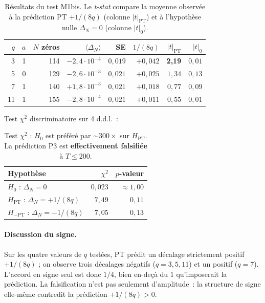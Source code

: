 \begin{table}[ht]
\centering
\small
\begin{tabular}{@{}rrrrrrrr@{}}
\toprule
$q$ & $a$ & $N$ zéros & $\langle \Delta_N \rangle$ & SE & $1/(8q)$ & $|t|_{\mathrm{PT}}$ & $|t|_{0}$\\
\midrule
3 & 1 & 114 & $-2{,}4 \cdot 10^{-4}$ & $0{,}019$ & $+0{,}042$ & \textbf{2{,}19} & $0{,}01$\\
5 & 0 & 129 & $-2{,}6 \cdot 10^{-3}$ & $0{,}021$ & $+0{,}025$ & $1{,}34$ & $0{,}13$\\
7 & 1 & 140 & $+1{,}8 \cdot 10^{-3}$ & $0{,}021$ & $+0{,}018$ & $0{,}77$ & $0{,}09$\\
11 & 1 & 155 & $-2{,}8 \cdot 10^{-4}$ & $0{,}021$ & $+0{,}011$ & $0{,}55$ & $0{,}01$\\
\bottomrule
\end{tabular}
\caption{Résultats du test M1bis. Le \emph{t-stat} compare la moyenne
observée à la prédiction PT $+1/(8q)$ (colonne $|t|_{\mathrm{PT}}$) et à
l'hypothèse nulle $\Delta_N = 0$ (colonne $|t|_{0}$).}
\label{tab:M1bis}
\end{table}

Test $\chi^{2}$ discriminatoire sur 4 d.d.l.~:

\begin{table}[ht]
\centering
\begin{tabular}{@{}lrr@{}}
\toprule
\textbf{Hypothèse} & $\chi^{2}$ & $p$-valeur\\
\midrule
$H_0$ : $\Delta_N = 0$ & $0{,}023$ & $\approx 1{,}00$\\
$H_{\mathrm{PT}}$ : $\Delta_N = +1/(8q)$ & $7{,}49$ & $0{,}11$\\
$H_{-\mathrm{PT}}$ : $\Delta_N = -1/(8q)$ & $7{,}05$ & $0{,}13$\\
\bottomrule
\end{tabular}
\caption{Test $\chi^{2}$ : $H_0$ est préféré par $\sim 300\times$ sur
$H_{\mathrm{PT}}$. La prédiction P3 est \textbf{effectivement falsifiée}
à $T \le 200$.}
\label{tab:chi2_dirichlet}
\end{table}

\paragraph{Discussion du signe.}
Sur les quatre valeurs de $q$ testées, PT prédit un décalage strictement
positif $+1/(8q)$ ; on observe trois décalages négatifs ($q = 3, 5, 11$)
et un positif ($q = 7$). L'accord en signe seul est donc $1/4$, bien
en-deçà du $1$ qu'imposerait la prédiction. La falsification n'est pas
seulement d'amplitude~: la structure de signe elle-même contredit la
prédiction $+1/(8q) > 0$.

